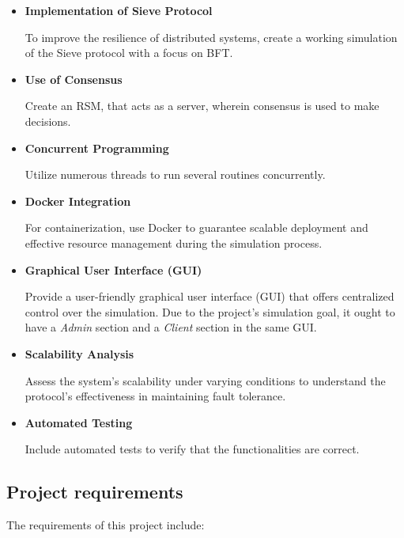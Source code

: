 \documentclass{scrartcl}
\begin{document}
\begin{itemize}
    \item \textbf{Implementation of Sieve Protocol}
    
    To improve the resilience of distributed systems, create a working simulation of the Sieve protocol with a focus on BFT.

    \item \textbf{Use of Consensus}

    Create an RSM, that acts as a server, wherein consensus is used to make decisions.

    \item \textbf{Concurrent Programming}

    Utilize numerous threads to run several routines concurrently.
    
    \item \textbf{Docker Integration}
    
    For containerization, use Docker to guarantee scalable deployment and effective resource management during the simulation process.

    \item \textbf{Graphical User Interface (GUI)}
    
    Provide a user-friendly graphical user interface (GUI) that offers centralized control over the simulation. Due to the project's simulation goal, it ought to have a \textit{Admin} section and a \textit{Client} section in the same GUI.

    \item \textbf{Scalability Analysis}
    
    Assess the system's scalability under varying conditions to understand the protocol's effectiveness in maintaining fault tolerance.

    \item \textbf{Automated Testing}
    
    Include automated tests to verify that the functionalities are correct.
\end{itemize}


\subsection{Project requirements}

The requirements of this project include:
\end{document}
